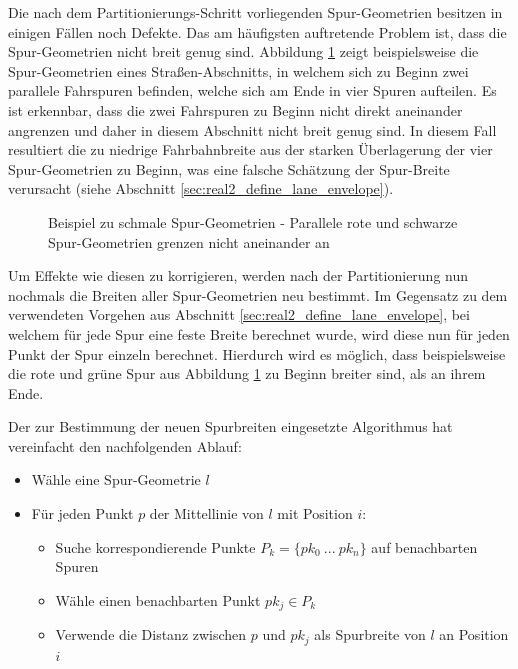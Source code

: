 Die nach dem Partitionierungs-Schritt vorliegenden Spur-Geometrien besitzen in einigen Fällen noch Defekte.
Das am häufigsten auftretende Problem ist, dass die Spur-Geometrien nicht breit genug sind.
Abbildung \ref{fig:real2_pre_opt} zeigt beispielsweise die Spur-Geometrien eines Straßen-Abschnitts,
in welchem sich zu Beginn zwei parallele Fahrspuren befinden, welche sich am Ende in vier Spuren aufteilen.
Es ist erkennbar, dass die zwei Fahrspuren zu Beginn nicht direkt aneinander angrenzen
und daher in diesem Abschnitt nicht breit genug sind. In diesem Fall resultiert die zu niedrige Fahrbahnbreite
aus der starken Überlagerung der vier Spur-Geometrien zu Beginn, was eine falsche Schätzung der Spur-Breite verursacht
(siehe Abschnitt \ref{sec:real2_define_lane_envelope}).

\begin{figure}[H]
    \centering
    \caption[Beispiel zu schmale Spur-Geometrien]
            {Beispiel zu schmale Spur-Geometrien - Parallele rote und schwarze Spur-Geometrien grenzen nicht aneinander an}
    \label{fig:real2_pre_opt}
\end{figure}

Um Effekte wie diesen zu korrigieren, werden nach der Partitionierung nun nochmals die Breiten aller Spur-Geometrien
neu bestimmt. Im Gegensatz zu dem verwendeten Vorgehen aus Abschnitt \ref{sec:real2_define_lane_envelope},
bei welchem für jede Spur eine feste Breite berechnet wurde, wird diese nun für jeden Punkt der Spur einzeln
berechnet. Hierdurch wird es möglich, dass beispielsweise die rote und grüne Spur aus Abbildung \ref{fig:real2_pre_opt}
zu Beginn breiter sind, als an ihrem Ende.

Der zur Bestimmung der neuen Spurbreiten eingesetzte Algorithmus hat vereinfacht den nachfolgenden Ablauf:

\begin{itemize}
    \item Wähle eine Spur-Geometrie $l$
    \item Für jeden Punkt $p$ der Mittellinie von $l$ mit Position $i$:
    \begin{itemize}
        \item Suche korrespondierende Punkte $P_k = \{pk_0\ ...\ pk_n\}$ auf benachbarten Spuren
        \item Wähle einen benachbarten Punkt $pk_j \in P_k$
        \item Verwende die Distanz zwischen $p$ und $pk_j$ als Spurbreite von $l$ an Position $i$
    \end{itemize}
\end{itemize}

